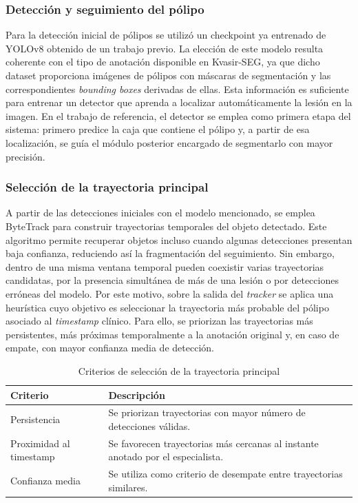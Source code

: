 ﻿\documentclass[10pt,a4paper,twocolumn,twoside]{article}
\begin{document}
\subsubsection{Detección y seguimiento del pólipo}
Para la detección inicial de pólipos se utilizó un checkpoint ya entrenado de YOLOv8 obtenido de un trabajo previo. La elección de este modelo resulta coherente con el tipo de anotación disponible en Kvasir-SEG, ya que dicho dataset proporciona imágenes de pólipos con máscaras de segmentación y las correspondientes \textit{bounding boxes} derivadas de ellas. Esta información es suficiente para entrenar un detector que aprenda a localizar automáticamente la lesión en la imagen. En el trabajo de referencia, el detector se emplea como primera etapa del sistema: primero predice la caja que contiene el pólipo y, a partir de esa localización, se guía el módulo posterior encargado de segmentarlo con mayor precisión.\cite{kvasirseg2019,sajjad_yolo_sam2}

\subsubsection{Selección de la trayectoria principal}
A partir de las detecciones iniciales con el modelo mencionado, se emplea ByteTrack\cite{zhang2022bytetrack} para construir trayectorias temporales del objeto detectado. Este algoritmo permite recuperar objetos incluso cuando algunas detecciones presentan baja confianza, reduciendo así la fragmentación del seguimiento. Sin embargo, dentro de una misma ventana temporal pueden coexistir varias trayectorias candidatas, por la presencia simultánea de más de una lesión o por detecciones erróneas del modelo. Por este motivo, sobre la salida del \textit{tracker} se aplica una heurística cuyo objetivo es seleccionar la trayectoria más probable del pólipo asociado al \textit{timestamp} clínico. Para ello, se priorizan las trayectorias más persistentes, más próximas temporalmente a la anotación original y, en caso de empate, con mayor confianza media de detección.

\begin{table}[t]
\centering
\small
\setlength{\tabcolsep}{4pt}
\caption{Criterios de selección de la trayectoria principal}
\label{tab:primary_track_selection}
\begin{tabularx}{\columnwidth}{|>{\raggedright\arraybackslash}p{2.4cm}|>{\raggedright\arraybackslash}X|}
\hline
\textbf{Criterio} & \textbf{Descripción} \\
\hline
Persistencia & Se priorizan trayectorias con mayor número de detecciones válidas. \\
Proximidad al timestamp & Se favorecen trayectorias más cercanas al instante anotado por el especialista. \\
Confianza media & Se utiliza como criterio de desempate entre trayectorias similares. \\
\hline
\end{tabularx}
\end{table}
\end{document}
